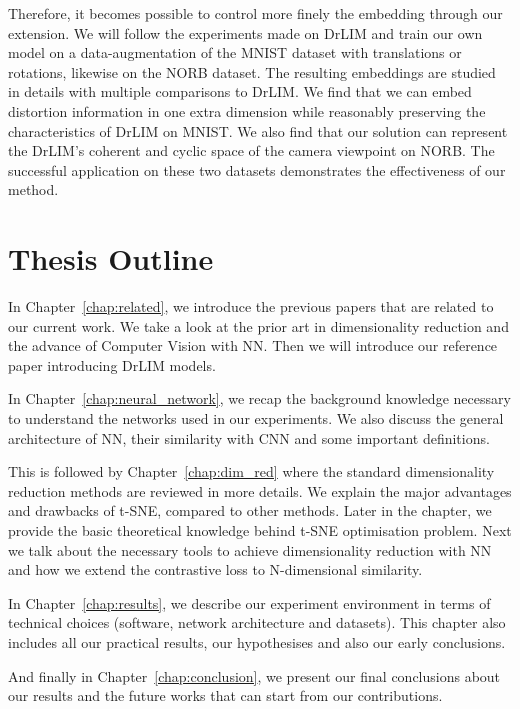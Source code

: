 \documentclass[a4paper,12pt]{report}
\begin{document}
Therefore, it becomes possible to control more finely the embedding through our extension.
We will follow the experiments made on DrLIM and train our own model on a data-augmentation of the MNIST dataset\cite{lecun1998mnist} with translations or rotations, likewise on the NORB dataset\cite{lecun2004learning}.
The resulting embeddings are studied in details with multiple comparisons to DrLIM.
We find that we can embed distortion information in one extra dimension while reasonably preserving the characteristics of DrLIM on MNIST.
We also find that our solution can represent the DrLIM's coherent and cyclic space of the camera viewpoint on NORB.
The successful application on these two datasets demonstrates the effectiveness of our method.

\section{Thesis Outline}
In Chapter~\ref{chap:related}, we introduce the previous papers that are related to our current work.
We take a look at the prior art in dimensionality reduction and the advance of Computer Vision with NN.
Then we will introduce our reference paper introducing DrLIM models.

In Chapter~\ref{chap:neural_network}, we recap the background knowledge necessary to understand the networks used in our experiments.
We also discuss the general architecture of NN, their similarity with CNN and some important definitions.

This is followed by Chapter~\ref{chap:dim_red} where the standard dimensionality reduction methods are reviewed in more details.
We explain the major advantages and drawbacks of t-SNE, compared to other methods.
Later in the chapter, we provide the basic theoretical knowledge behind t-SNE optimisation problem.
Next we talk about the necessary tools to achieve dimensionality reduction with NN and how we extend the contrastive loss to N-dimensional similarity.

In Chapter~\ref{chap:results}, we describe our experiment environment in terms of technical choices (software, network architecture and datasets).
This chapter also includes all our practical results, our hypothesises and also our early conclusions.

And finally in Chapter~\ref{chap:conclusion}, we present our final conclusions about our results and the future works that can start from our contributions.
\end{document}
